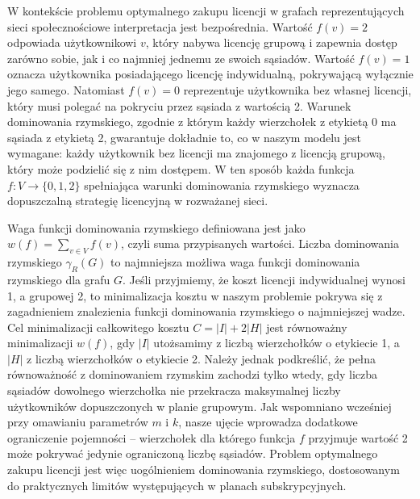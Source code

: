 W kontekście problemu optymalnego zakupu licencji w grafach reprezentujących sieci społecznościowe interpretacja jest bezpośrednia. Wartość $f(v)=2$ odpowiada użytkownikowi $v$, który nabywa licencję grupową i zapewnia dostęp zarówno sobie, jak i co najmniej jednemu ze swoich sąsiadów. Wartość $f(v)=1$ oznacza użytkownika posiadającego licencję indywidualną, pokrywającą wyłącznie jego samego. Natomiast $f(v)=0$ reprezentuje użytkownika bez własnej licencji, który musi polegać na pokryciu przez sąsiada z wartością 2. Warunek dominowania rzymskiego, zgodnie z którym każdy wierzchołek z etykietą 0 ma sąsiada z etykietą 2, gwarantuje dokładnie to, co w naszym modelu jest wymagane: każdy użytkownik bez licencji ma znajomego z licencją grupową, który może podzielić się z nim dostępem. W ten sposób każda funkcja $f:V \to \{0,1,2\}$ spełniająca warunki dominowania rzymskiego wyznacza dopuszczalną strategię licencyjną w rozważanej sieci.


Waga funkcji dominowania rzymskiego definiowana jest jako $w(f) = \sum_{v \in V} f(v)$, czyli suma przypisanych wartości. Liczba dominowania rzymskiego $\gamma_R(G)$ to najmniejsza możliwa waga funkcji dominowania rzymskiego dla grafu $G$. Jeśli przyjmiemy, że koszt licencji indywidualnej wynosi 1, a grupowej 2, to minimalizacja kosztu w naszym problemie pokrywa się z zagadnieniem znalezienia funkcji dominowania rzymskiego o najmniejszej wadze. Cel minimalizacji całkowitego kosztu $C = |I| + 2|H|$ jest równoważny minimalizacji $w(f)$, gdy $|I|$ utożsamimy z liczbą wierzchołków o etykiecie 1, a $|H|$ z liczbą wierzchołków o etykiecie 2. Należy jednak podkreślić, że pełna równoważność z dominowaniem rzymskim zachodzi tylko wtedy, gdy liczba sąsiadów dowolnego wierzchołka nie przekracza maksymalnej liczby użytkowników dopuszczonych w planie grupowym. Jak wspomniano wcześniej przy omawianiu parametrów $m$ i $k$, nasze ujęcie wprowadza dodatkowe ograniczenie pojemności -- wierzchołek dla którego funkcja $f$ przyjmuje wartość 2 może pokrywać jedynie ograniczoną liczbę sąsiadów. Problem optymalnego zakupu licencji jest więc uogólnieniem dominowania rzymskiego, dostosowanym do praktycznych limitów występujących w planach subskrypcyjnych.

